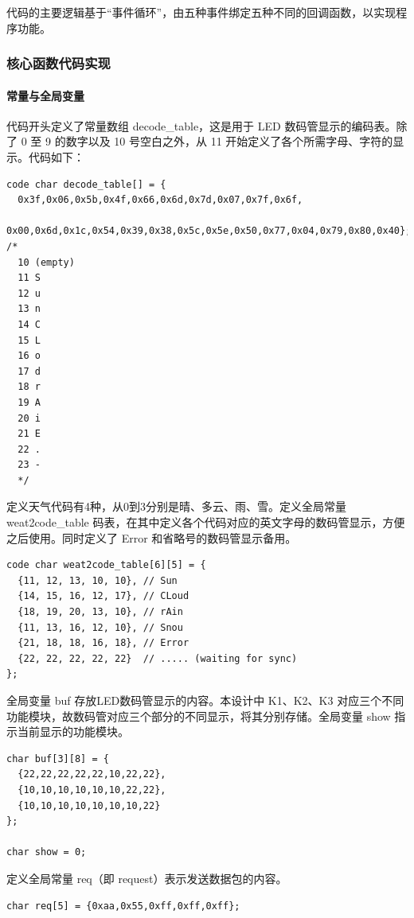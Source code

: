 \documentclass{article}
\begin{document}
代码的主要逻辑基于“事件循环”，由五种事件绑定五种不同的回调函数，以实现程序功能。

\subsubsection{核心函数代码实现}

\paragraph{常量与全局变量} 代码开头定义了常量数组 decode\_table，这是用于 LED 数码管显示的编码表。除了 0 至 9 的数字以及 10 号空白之外，从 11 开始定义了各个所需字母、字符的显示。代码如下：

\begin{verbatim}
code char decode_table[] = {
  0x3f,0x06,0x5b,0x4f,0x66,0x6d,0x7d,0x07,0x7f,0x6f,
  0x00,0x6d,0x1c,0x54,0x39,0x38,0x5c,0x5e,0x50,0x77,0x04,0x79,0x80,0x40};
/*
  10 (empty)
  11 S
  12 u
  13 n
  14 C
  15 L
  16 o
  17 d
  18 r
  19 A
  20 i
  21 E
  22 .
  23 -
  */
\end{verbatim}

定义天气代码有4种，从0到3分别是晴、多云、雨、雪。定义全局常量 weat2code\_table 码表，在其中定义各个代码对应的英文字母的数码管显示，方便之后使用。同时定义了 Error 和省略号的数码管显示备用。

\begin{verbatim}
code char weat2code_table[6][5] = {
  {11, 12, 13, 10, 10}, // Sun
  {14, 15, 16, 12, 17}, // CLoud
  {18, 19, 20, 13, 10}, // rAin
  {11, 13, 16, 12, 10}, // Snou
  {21, 18, 18, 16, 18}, // Error
  {22, 22, 22, 22, 22}  // ..... (waiting for sync)
};
\end{verbatim}

全局变量 buf 存放LED数码管显示的内容。本设计中 K1、K2、K3 对应三个不同功能模块，故数码管对应三个部分的不同显示，将其分别存储。全局变量 show 指示当前显示的功能模块。

\begin{verbatim}
char buf[3][8] = {
  {22,22,22,22,22,10,22,22},
  {10,10,10,10,10,10,22,22},
  {10,10,10,10,10,10,10,22}
};

char show = 0;
\end{verbatim}

定义全局常量 req（即 request）表示发送数据包的内容。

\begin{verbatim}
char req[5] = {0xaa,0x55,0xff,0xff,0xff};
\end{verbatim}
\end{document}
